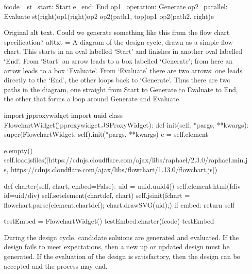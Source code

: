 \documentclass[letterpaper,10pt,english]{sphinxmanual}
\begin{document}
{{\begin{sphinxVerbatim}[commandchars=\\\{\}]
fcode=\PYGZsq{}\PYGZsq{}\PYGZsq{}
st=\PYGZgt{}start: Start
e=\PYGZgt{}end: End
op1=\PYGZgt{}operation: Generate
op2=\PYGZgt{}parallel: Evaluate
st(right)\PYGZhy{}\PYGZgt{}op1(right)\PYGZhy{}\PYGZgt{}op2
op2(path1, top)\PYGZhy{}\PYGZgt{}op1
op2(path2, right)\PYGZhy{}\PYGZgt{}e
\PYGZsq{}\PYGZsq{}\PYGZsq{}

\PYGZsh{}Original alt text.
\PYGZsh{} Could we generate something like this from the flow chart specification?
alt\PYGZus{}txt = \PYGZdq{}\PYGZdq{}\PYGZdq{}
A diagram of the design cycle, drawn as a simple flow chart.
This starts in an oval labelled ‘Start’ and finishes in another oval labelled ‘End’.
From ‘Start’ an arrow leads to a box labelled ‘Generate’;
from here an arrow leads to a box ‘Evaluate’.
From ‘Evaluate’ there are two arrows:
one leads directly to the ‘End’, the other loops back to ‘Generate’.
Thus there are two paths in the diagram,
one straight from Start to Generate to Evaluate to End,
the other that forms a loop around Generate and Evaluate.\PYGZdq{}\PYGZdq{}\PYGZdq{}

import jp\PYGZus{}proxy\PYGZus{}widget
import uuid
class FlowchartWidget(jp\PYGZus{}proxy\PYGZus{}widget.JSProxyWidget):
    def \PYGZus{}\PYGZus{}init\PYGZus{}\PYGZus{}(self, *pargs, **kwargs):
        super(FlowchartWidget, self).\PYGZus{}\PYGZus{}init\PYGZus{}\PYGZus{}(*pargs, **kwargs)
        e = self.element

        e.empty()
        self.load\PYGZus{}js\PYGZus{}files([\PYGZdq{}https://cdnjs.cloudflare.com/ajax/libs/raphael/2.3.0/raphael.min.js\PYGZdq{},
                            \PYGZsq{}https://cdnjs.cloudflare.com/ajax/libs/flowchart/1.13.0/flowchart.js\PYGZsq{}])

    def charter(self, chart, embed=False):
        uid = uuid.uuid4()
        self.element.html(f\PYGZsq{}\PYGZlt{}div id=\PYGZdq{}\PYGZob{}uid\PYGZcb{}\PYGZdq{}\PYGZgt{}\PYGZlt{}/div\PYGZgt{}\PYGZsq{})
        self.set\PYGZus{}element(\PYGZdq{}chartdef\PYGZdq{}, chart)
        self.js\PYGZus{}init(f\PYGZdq{}chart = flowchart.parse(element.chartdef); chart.drawSVG(\PYGZsq{}\PYGZob{}uid\PYGZcb{}\PYGZsq{});\PYGZdq{})
        if embed:
            return self

testEmbed = FlowchartWidget()
testEmbed.charter(fcode)
testEmbed

\end{sphinxVerbatim}
}

During the design cycle, candidate soluions are generated and evaluated. If the design fails to meet expectations, then a new up or updated design must be generated. If the evaluation of the design is satisfactory, then the design can be accepted and the process may end.

}
\end{document}

